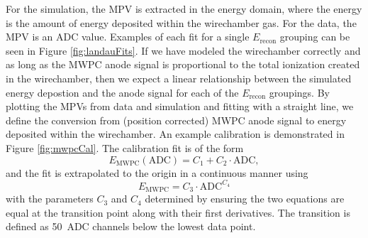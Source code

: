 For the simulation, the MPV is extracted in the energy domain, where the energy is the
amount of energy deposited within the wirechamber gas. For the data, the MPV is an ADC value.
Examples of each fit for a single $E_{\mathrm{recon}}$ grouping can be seen in Figure \ref{fig:landauFits}.
If we
have modeled the wirechamber correctly and as long as the MWPC anode signal is proportional to
the total ionization created in the wirechamber, then we expect a linear relationship between the
simulated energy depostion and the anode signal for each of the $E_{\mathrm{recon}}$ groupings. By plotting
the MPVs from data and simulation and fitting with a straight line, we define the conversion
from (position corrected) MWPC anode signal to energy deposited within the wirechamber. An example
calibration is demonstrated in Figure \ref{fig:mwpcCal}. The calibration fit is of the form
%
\begin{equation} \label{eq:pureLin}
  E_{\mathrm{MWPC}}(\mathrm{ADC}) = C_1 + C_2\cdot \mathrm{ADC},
\end{equation}
and the fit is extrapolated to the origin in a continuous manner using
\begin{equation}
  E_{\mathrm{MWPC}} = C_3 \cdot \mathrm{ADC}^{C_4}
\end{equation}
with the parameters $C_3$ and $C_4$ determined by ensuring the two equations are equal at the
transition point along with their first derivatives. The transition is defined as 50~ADC channels
below the lowest data point.

